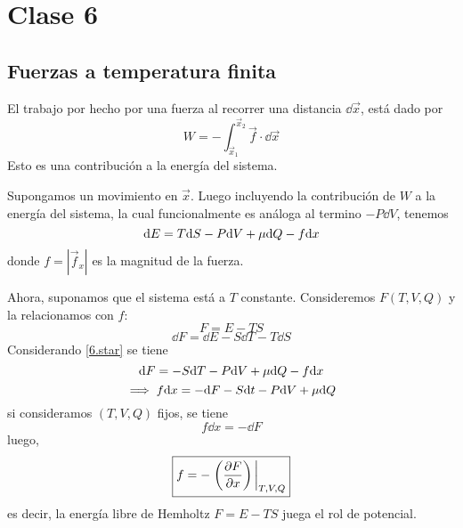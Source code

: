 \section{Clase 6}
%

\subsection{Fuerzas a temperatura finita}
El trabajo por hecho por una fuerza al recorrer una distancia $\dd\vec{x}$, está dado por
\begin{equation}
  W=-\int_{\vec{x}_1}^{\vec{x}_2}\vec{f}\cdot\dd\vec{x}
\end{equation}
Esto es una contribución a la energía del sistema.

Supongamos un movimiento en $\vec{x}$. Luego incluyendo la contribución de $W$ a la energía del sistema, la cual funcionalmente es análoga al termino $-P\dd V$, tenemos
\begin{equation}\label{6.star}
  \dd E=T\dd S-P\dd V+\mu\dd Q-f\dd x
\end{equation}
donde $f=|\vec{f}_x|$ es la magnitud de la fuerza.

Ahora, suponamos que el sistema está a $T$ constante. Consideremos $F(T,V,Q)$ y la relacionamos con $f$:
\begin{equation}
  F=E-TS
\end{equation}
\begin{equation}
  \dd F=\dd E-S\dd T-T\dd S
\end{equation}
Considerando \eqref{6.star} se tiene
\begin{equation}
  \dd F=-S\dd T-P\dd V+\mu \dd Q-f\dd x
\end{equation}
\begin{equation}
  \implies f\dd x=-\dd F-S\dd t-P\dd V+\mu\dd Q
\end{equation}
si consideramos $(T,V,Q)$ fijos, se tiene
\begin{equation}
  f\dd x=-\dd F
\end{equation}
luego,
\begin{equation}
 \boxed{ f=-\eval{\left(\pdv{F}{x}\right)}_{T,V,Q}}
\end{equation}
es decir, la energía libre de Hemholtz $F=E-TS$ juega el rol de potencial.

